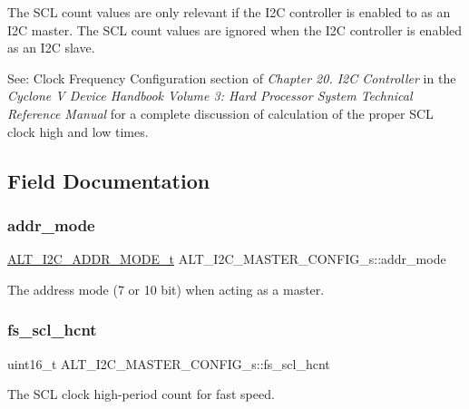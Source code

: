 The S\+CL count values are only relevant if the I2C controller is enabled to as an I2C master. The S\+CL count values are ignored when the I2C controller is enabled as an I2C slave.

See\+: Clock Frequency Configuration section of {\itshape Chapter 20. I2C Controller} in the {\itshape Cyclone V Device Handbook Volume 3\+: Hard Processor System Technical Reference Manual} for a complete discussion of calculation of the proper S\+CL clock high and low times. 

\subsection{Field Documentation}
\mbox{\label{structALT__I2C__MASTER__CONFIG__s_a921c0ba4fc75b0cf621075eb419a20d1}} 
\subsubsection{\texorpdfstring{addr\_mode}{addr\_mode}}
{\footnotesize\ttfamily \mbox{\hyperlink{group__ALT__I2C_gacaf56449440abffe69a7941f24f9bf5b}{A\+L\+T\+\_\+\+I2\+C\+\_\+\+A\+D\+D\+R\+\_\+\+M\+O\+D\+E\+\_\+t}} A\+L\+T\+\_\+\+I2\+C\+\_\+\+M\+A\+S\+T\+E\+R\+\_\+\+C\+O\+N\+F\+I\+G\+\_\+s\+::addr\+\_\+mode}

The address mode (7 or 10 bit) when acting as a master. \mbox{\label{structALT__I2C__MASTER__CONFIG__s_a58f4621200f41b649d45bb5fbd9ae8ca}} 
\subsubsection{\texorpdfstring{fs\_scl\_hcnt}{fs\_scl\_hcnt}}
{\footnotesize\ttfamily uint16\+\_\+t A\+L\+T\+\_\+\+I2\+C\+\_\+\+M\+A\+S\+T\+E\+R\+\_\+\+C\+O\+N\+F\+I\+G\+\_\+s\+::fs\+\_\+scl\+\_\+hcnt}

The S\+CL clock high-\/period count for fast speed. \mbox{\label{structALT__I2C__MASTER__CONFIG__s_ae9010068db86d57b4c0b1a6159753c57}} 
